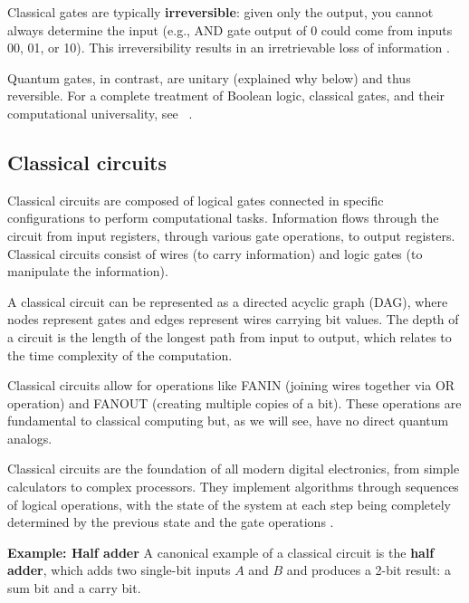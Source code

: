 \documentclass[a4paper,12pt]{amsart}
\begin{document}
Classical gates are typically \textbf{irreversible}: given only the output, you cannot always determine the input (e.g., AND gate output of 0 could come from inputs 00, 01, or 10). This irreversibility results in an irretrievable loss of information \cite{nielsen2011quantum}.

Quantum gates, in contrast, are unitary (explained why below) and thus reversible. For a complete treatment of Boolean logic, classical gates, and their computational universality, see ~\cite[Chapter~1]{nielsen2011quantum}.

\subsection{Classical circuits}
Classical circuits are composed of logical gates connected in specific configurations to perform computational tasks. Information flows through the circuit from input registers, through various gate operations, to output registers. Classical circuits consist of wires (to carry information) and logic gates (to manipulate the information).

A classical circuit can be represented as a directed acyclic graph (DAG), where nodes represent gates and edges represent wires carrying bit values. The depth of a circuit is the length of the longest path from input to output, which relates to the time complexity of the computation.

Classical circuits allow for operations like FANIN (joining wires together via OR operation) and FANOUT (creating multiple copies of a bit). These operations are fundamental to classical computing but, as we will see, have no direct quantum analogs.

Classical circuits are the foundation of all modern digital electronics, from simple calculators to complex processors. They implement algorithms through sequences of logical operations, with the state of the system at each step being completely determined by the previous state and the gate operations \cite{nielsen2011quantum, yanofsky2008quantum}.

\textbf{Example: Half adder}
A canonical example of a classical circuit is the \textbf{half adder}, which adds two single-bit inputs $A$ and $B$ and produces a 2-bit result: a sum bit and a carry bit.
\end{document}
